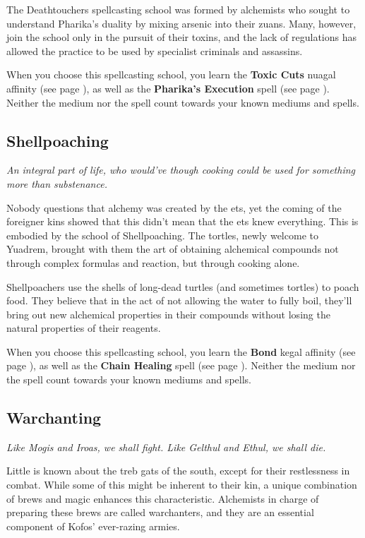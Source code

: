     The Deathtouchers spellcasting school was formed by alchemists who sought to understand Pharika's duality by mixing arsenic into their zuans.
    Many, however, join the school only in the pursuit of their toxins, and the lack of regulations has allowed the practice to be used by specialist criminals and assassins.

    When you choose this spellcasting school, you learn the \textbf{Toxic Cuts} nuagal affinity (see page \pageref{medium::toxiccuts}), as well as the \textbf{Pharika's Execution} spell (see page \pageref{spell::pharikasexecution}).
    Neither the medium nor the spell count towards your known mediums and spells.

\subsection*{Shellpoaching} \label{ssec::shellpoaching}
    \textit{An integral part of life, who would've though cooking could be used for something more than substenance.}

    Nobody questions that alchemy was created by the ets, yet the coming of the foreigner kins showed that this didn't mean that the ets knew everything.
    This is embodied by the school of Shellpoaching.
    The tortles, newly welcome to Yuadrem, brought with them the art of obtaining alchemical compounds not through complex formulas and reaction, but through cooking alone.

    Shellpoachers use the shells of long-dead turtles (and sometimes tortles) to poach food.
    They believe that in the act of not allowing the water to fully boil, they'll bring out new alchemical properties in their compounds without losing the natural properties of their reagents.

    When you choose this spellcasting school, you learn the \textbf{Bond} kegal affinity (see page \pageref{medium::bond}), as well as the \textbf{Chain Healing} spell (see page \pageref{spell::chainhealing}).
    Neither the medium nor the spell count towards your known mediums and spells.

\subsection*{Warchanting} \label{ssec::warchanting}
    \textit{Like Mogis and Iroas, we shall fight.
    Like Gelthul and Ethul, we shall die.}

    Little is known about the treb gats of the south, except for their restlessness in combat.
    While some of this might be inherent to their kin, a unique combination of brews and magic enhances this characteristic.
    Alchemists in charge of preparing these brews are called warchanters, and they are an essential component of Kofos' ever-razing armies.

